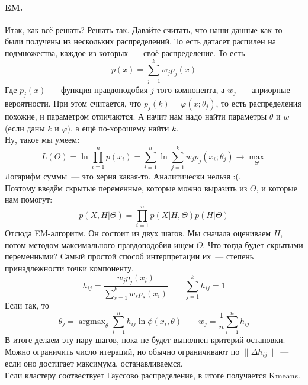 \documentclass{article}
\begin{document}
    \paragraph{EM.}
    Итак, как всё решать? Решать так. Давайте считать, что наши данные как-то были получены из нескольких распределений. То есть датасет распилен на подмножества, каждое из которых~--- своё распределение. То есть
    \[
    p(x)=\sum\limits_{j=1}^kw_jp_j(x)
    \]
    Где $p_j(x)$~--- функция правдоподобия $j$-того компонента, а $w_j$~--- априорные вероятности. При этом считается, что $p_j(k)=\varphi(x;\theta_j)$, то есть распределения похожие, и параметром отличаются. А начит нам надо найти параметры $\theta$ и $w$ (если даны $k$ и $\varphi$), а ещё по-хорошему найти $k$.\\
    Ну, такое мы умеем:
    \[
    L(\Theta)=\ln\prod\limits_{i=1}^np(x_i)=\sum\limits_{i=1}^n\ln\sum\limits_{j=1}^kw_jp_j(x_i;\theta_j)\to\max_\Theta
    \]
    Логарифм суммы~--- это херня какая-то. Аналитически нельзя :(.\\
    Поэтому введём скрытые переменные, которые можно выразить из $\Theta$, и которые нам помогут:
    \[
    p(X,H|\Theta)=\prod\limits_{i=1}^np(X|H,\Theta)p(H|\Theta)
    \]
    Отсюда EM-алгоритм. Он состоит из двух шагов. Мы сначала оцениваем $H$, потом методом максимального правдоподобия ищем $\Theta$. Что тогда будет скрытыми переменными? Самый простой способ интерпретации их~--- степень принадлежности точки компоненту.
    \[
    h_{ij}=\frac{w_jp_j(x_i)}{\sum_{s=1}^kw_sp_s(x_i)}\qquad\sum\limits_{j=1}^kh_{ij}=1
    \]
    Если так, то
    \[
    \theta_j=\operatorname{argmax}_\theta\sum\limits_{i=1}^nh_{ij}\ln\phi(x_i,\theta)\qquad w_j=\frac1n\sum\limits_{i=1}^nh_{ij}
    \]
    В итоге делаем эту пару шагов, пока не будет выполнен критерий остановки. Можно ограничить число итераций, но обычно ограничивают по $\|\Delta h_{ij}\|$~--- если оно достигает максимума, останавливаемся.\\
    Если кластеру соотвествует Гауссово распределение, в итоге получается Kmeans.
\end{document}
